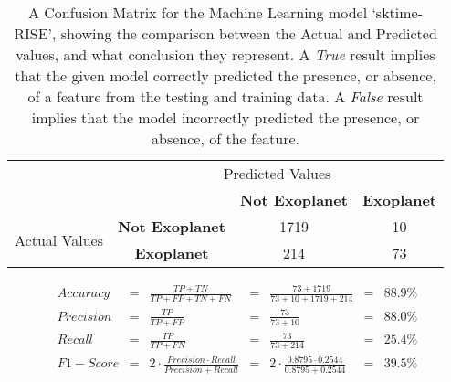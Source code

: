 
    \renewcommand{\arraystretch}{2}
    \renewcommand{\tabcolsep}{20.25pt}
    \vspace{-0.5cm}
    \begin{table}[ht]
    \begin{tabular}{cccc}
     & \multicolumn{3}{c}{Predicted Values} \\ \cline{3-4}
     & \multicolumn{1}{c|}{} & \multicolumn{1}{c|}{\textbf{Not Exoplanet}} & \multicolumn{1}{c|}{\textbf{Exoplanet}} \\ \cline{2-4}
    \multicolumn{1}{c|}{\multirow{2}{2.0cm}{Actual Values}} & \multicolumn{1}{c|}{\textbf{Not Exoplanet}} & \multicolumn{1}{c|}{1719} & \multicolumn{1}{c|}{10} \\ \cline{2-4}
    \multicolumn{1}{c|}{} & \multicolumn{1}{c|}{\textbf{Exoplanet}} & \multicolumn{1}{c|}{214} & \multicolumn{1}{c|}{73} \\ \cline{2-4}
    \end{tabular}
    \caption{A Confusion Matrix for the Machine Learning model `sktime-RISE', showing the comparison between the Actual and Predicted values, and what conclusion they represent. A \emph{True} result implies that the given model correctly predicted the presence, or absence, of a feature from the testing and training data. A \emph{False} result implies that the model incorrectly predicted the presence, or absence, of the feature.}
    \label{tab:sktime-RISEconfusionmatrix}
    \end{table}
    \vspace{-0.75cm}
    \label{eq:metrics-sktime-RISE}
    \begin{align*}
        Accuracy &= &\frac{TP + TN}{TP + FP + TN + FN} &= &\frac{73 + 1719}{73 + 10 + 1719 + 214} &= & 88.9\% \\
        Precision &= &\frac{TP}{TP + FP} &= &\frac{73}{73 + 10} &= & 88.0\% \\
        Recall &= &\frac{TP}{TP + FN} &= &\frac{73}{73 + 214} &= & 25.4\% \\
        F1-Score &= &2 \cdot \frac{Precision \cdot Recall}{Precision + Recall} &= &2 \cdot \frac{0.8795 \cdot 0.2544}{0.8795 + 0.2544} &= & 39.5\% \\
    \end{align*}
    \vspace{-1.75cm}
    \renewcommand{\arraystretch}{1}
    \renewcommand{\tabcolsep}{5.25pt}
    